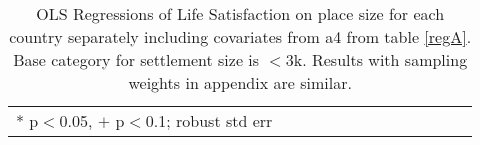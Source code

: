 \documentclass[10pt, letterpaper]{article}
\begin{document}
\begin{spacing}{1.4}
\begin{spacing}{.9} \begin{table}[H]\centering   \begin{scriptsize} \begin{tabular}{p{.5in}p{.5in}p{.5in}p{.5in}p{.5in}p{.5in}p{.5in}p{.5in}p{.5in}p{.5in}p{.5
                                                                      in}p{.5in}p{.5
                                                                      in}}\hline
                                                                      
                                                                      \hline *
                                                                      p$<$0.05,
                                                                      $+$
                                                                      p$<$0.1;
                                                                      robust std
                                                                      err \end{tabular}\end{scriptsize}\caption{\label{a4cou}OLS
                                                                    Regressions
                                                                    of Life Satisfaction on
                                                                    place size
                                                                    for each
                                                                    country
                                                                    separately
                                                                    including
                                                                    covariates
                                                                    from a4 from
                                                                    table
                                                                    \ref{regA}. %
   Base category for settlement size is $<$3k.                                                               Results with sampling weights in appendix are similar.  
                                                           }\end{table} \end{spacing}




\end{spacing}
\end{document}
